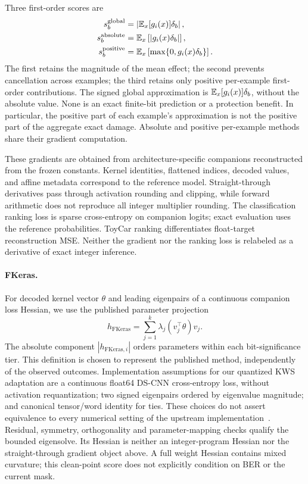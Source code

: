 Three first-order scores are
\begin{align}
s_b^{\mathrm{global}}&=\left|\mathbb{E}_x[g_i(x)]\delta_b\right|,\label{eq:global}\\
s_b^{\mathrm{absolute}}&=\mathbb{E}_x\left[|g_i(x)\delta_b|\right],\label{eq:absolute}\\
s_b^{\mathrm{positive}}&=\mathbb{E}_x\left[\max\{0,g_i(x)\delta_b\}\right].\label{eq:positive}
\end{align}
The first retains the magnitude of the mean effect; the second prevents cancellation across examples; the third retains only positive per-example first-order contributions. The signed global approximation is $\mathbb{E}_x[g_i(x)]\delta_b$, without the absolute value. None is an exact finite-bit prediction or a protection benefit. In particular, the positive part of each example's approximation is not the positive part of the aggregate exact damage. Absolute and positive per-example methods share their gradient computation.

These gradients are obtained from architecture-specific companions reconstructed from the frozen constants. Kernel identities, flattened indices, decoded values, and affine metadata correspond to the reference model. Straight-through derivatives pass through activation rounding and clipping, while forward arithmetic does not reproduce all integer multiplier rounding. The classification ranking loss is sparse cross-entropy on companion logits; exact evaluation uses the reference probabilities. ToyCar ranking differentiates float-target reconstruction MSE. Neither the gradient nor the ranking loss is relabeled as a derivative of exact integer inference.

\paragraph{FKeras.}
For decoded kernel vector $\theta$ and leading eigenpairs of a continuous companion loss Hessian, we use the published parameter projection~\cite{weng2024fkeras}
\begin{equation}
h_{\mathrm{FKeras}}=\sum_{j=1}^{k}\lambda_j(v_j^\top\theta)v_j.
\label{eq:fkeras}
\end{equation}
The absolute component $|h_{\mathrm{FKeras},i}|$ orders parameters within each
bit-significance tier. This definition is chosen to represent the published
method, independently of the observed outcomes. Implementation assumptions for
our quantized KWS adaptation are a continuous float64 DS-CNN cross-entropy loss,
without activation requantization; two signed eigenpairs ordered by eigenvalue
magnitude; and canonical tensor/word identity for ties. These choices do not
assert equivalence to every numerical setting of the upstream implementation~\cite{fkerasSource}.
Residual, symmetry, orthogonality and parameter-mapping checks qualify the
bounded eigensolve. Its Hessian is neither an integer-program Hessian nor the
straight-through gradient object above. A full weight Hessian contains mixed
curvature; this clean-point score does not explicitly condition on BER or the
current mask.

